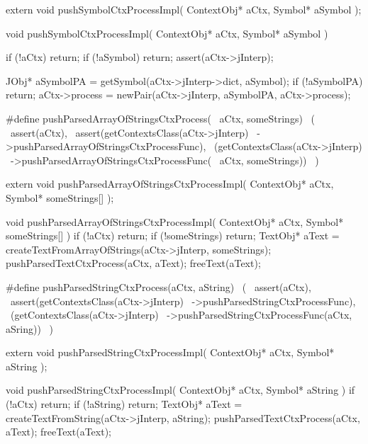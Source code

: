 \startCHeader
extern void pushSymbolCtxProcessImpl(
  ContextObj* aCtx,
  Symbol* aSymbol
);
\stopCHeader
{}

\startCCode
void pushSymbolCtxProcessImpl(
  ContextObj* aCtx,
  Symbol* aSymbol
) {
  if (!aCtx) return;
  if (!aSymbol) return;
  assert(aCtx->jInterp);

  JObj* aSymbolPA =
    getSymbol(aCtx->jInterp->dict, aSymbol);
  if (!aSymbolPA) return;
  aCtx->process = newPair(aCtx->jInterp, aSymbolPA, aCtx->process);
}
\stopCCode

\startCHeader
#define pushParsedArrayOfStringsCtxProcess(      \
  aCtx, someStrings)                             \
  (                                              \
    assert(aCtx),                                \
    assert(getContextsClass(aCtx->jInterp)       \
      ->pushParsedArrayOfStringsCtxProcessFunc), \
    (getContextsClass(aCtx->jInterp)             \
      ->pushParsedArrayOfStringsCtxProcessFunc(  \
        aCtx, someStrings))                      \
  )
\stopCHeader

\setCHeaderStream{private}
\startCHeader
extern void pushParsedArrayOfStringsCtxProcessImpl(
  ContextObj* aCtx,
  Symbol* someStrings[]
);
\stopCHeader
{}

\startCCode
void pushParsedArrayOfStringsCtxProcessImpl(
  ContextObj* aCtx,
  Symbol* someStrings[]
) {
  if (!aCtx) return;
  if (!someStrings) return;
  TextObj* aText =
    createTextFromArrayOfStrings(aCtx->jInterp, someStrings);
  pushParsedTextCtxProcess(aCtx, aText);
  freeText(aText);
}
\stopCCode

\startCHeader
#define pushParsedStringCtxProcess(aCtx, aString)      \
  (                                                    \
    assert(aCtx),                                      \
    assert(getContextsClass(aCtx->jInterp)             \
      ->pushParsedStringCtxProcessFunc),               \
    (getContextsClass(aCtx->jInterp)                   \
      ->pushParsedStringCtxProcessFunc(aCtx, aSring))  \
  )
\stopCHeader

\setCHeaderStream{private}
\startCHeader
extern void pushParsedStringCtxProcessImpl(
  ContextObj* aCtx,
  Symbol* aString
);
\stopCHeader
\setCHeaderStream{public}

\startCCode
void pushParsedStringCtxProcessImpl(
  ContextObj* aCtx,
  Symbol* aString
) {
  if (!aCtx) return;
  if (!aString) return;
  TextObj* aText =
    createTextFromString(aCtx->jInterp, aString);
  pushParsedTextCtxProcess(aCtx, aText);
  freeText(aText);
}
\stopCCode

